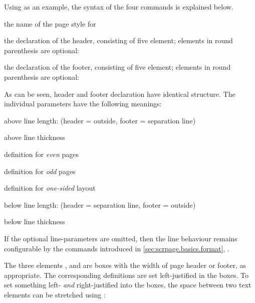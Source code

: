 Using  as an example, the syntax of the four
commands is explained below.
\begin{labeling}[~--]{}
\item[\PName{name}] the name of the page style for
\item[\PName{header definition}] the declaration of the header, consisting
  of five element; elements in round parenthesis are optional:\hfill\\
  \hspace*{1em}%
\item[\PName{footer definition}]  the declaration of the footer, consisting
  of five element; elements in round parenthesis are optional:\hfill\\  
  \hspace*{1em}%
\end{labeling}

As can be seen, header and footer declaration have identical
structure.  The individual parameters have the following meanings:
\begin{labeling}[\ --]{}
\item[\PName{ALL}] above line length: (header = outside, footer = separation
  line)
\item[\PName{ALT}] above line thickness
\item[\PName{EP}]  definition for \emph{even} pages
\item[\PName{OP}]  definition for \emph{odd} pages
\item[\PName{OS}]  definition for \emph{one-sided} layout
\item[\PName{BLL}] below line length: (header = separation line, footer =
  outside)
\item[\PName{BLT}] below line thickness
\end{labeling}

If the optional line-parameters are omitted, then the line behaviour remains
configurable by the commands introduced in
\autoref{sec:scrpage.basics.format},
.

The three elements ,  and  are boxes with the
width of page header or footer, as appropriate.  The corresponding definitions
are set left-justified in the boxes. To set something left- \emph{and}
right-justified into the boxes, the space between two text elements can be
stretched using :
%
\begin{lstcode}[belowskip=\dp\strutbox]
  {\headmark\hfill\pagemark}
\end{lstcode}


